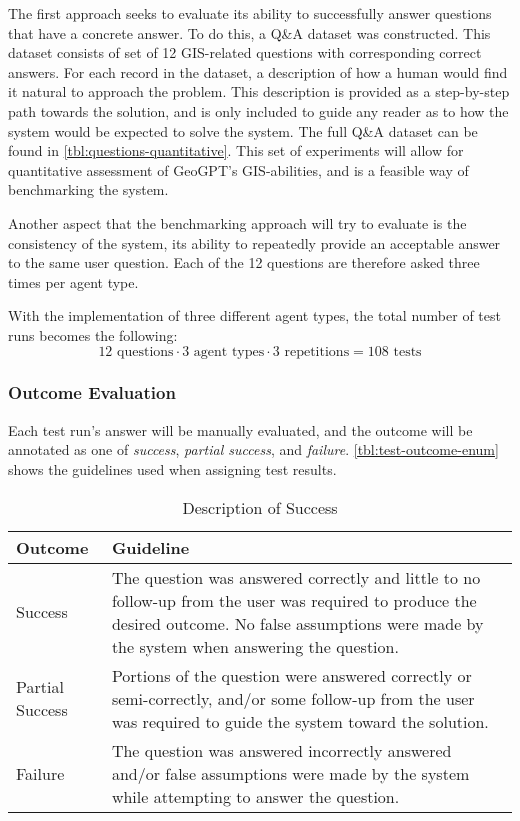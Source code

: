 The first approach seeks to evaluate its ability to successfully answer questions that have a concrete answer. To do this, a Q\&A dataset was constructed. This dataset consists of set of 12 GIS-related questions with corresponding correct answers. For each record in the dataset, a description of how a human would find it natural to approach the problem. This description is provided as a step-by-step path towards the solution, and is only included to guide any reader as to how the system would be expected to solve the system. The full Q\&A dataset can be found in \autoref{tbl:questions-quantitative}. This set of experiments will allow for quantitative assessment of GeoGPT's GIS-abilities, and is a feasible way of benchmarking the system.

Another aspect that the benchmarking approach will try to evaluate is the consistency of the system, its ability to repeatedly provide an acceptable answer to the same user question. Each of the 12 questions are therefore asked three times per agent type.

With the implementation of three different agent types, the total number of test runs becomes the following: $$12 \text{ questions} \cdot 3 \text{ agent types} \cdot 3 \text{ repetitions} = 108 \text{ tests}$$


\subsubsection{Outcome Evaluation}

Each test run's answer will be manually evaluated, and the outcome will be annotated as one of \textit{success}, \textit{partial success}, and \textit{failure}. \autoref{tbl:test-outcome-enum} shows the guidelines used when assigning test results.

\begin{table}[htbp]
    \centering
    \caption{Description of Success}
    \label{tbl:test-outcome-enum}
    \begin{tabularx}{0.9\textwidth}{p{3cm}X}
        \toprule
        \textbf{Outcome} & \textbf{Guideline}                                                                                                                                                                                  \\
        \midrule
        Success          & The question was answered correctly and little to no follow-up from the user was required to produce the desired outcome. No false assumptions were made by the system when answering the question. \\
        Partial Success  & Portions of the question were answered correctly or semi-correctly, and/or some follow-up from the user was required to guide the system toward the solution.                                       \\
        Failure          & The question was answered incorrectly answered and/or false assumptions were made by the system while attempting to answer the question.                                                            \\
        \bottomrule
    \end{tabularx}
\end{table}

